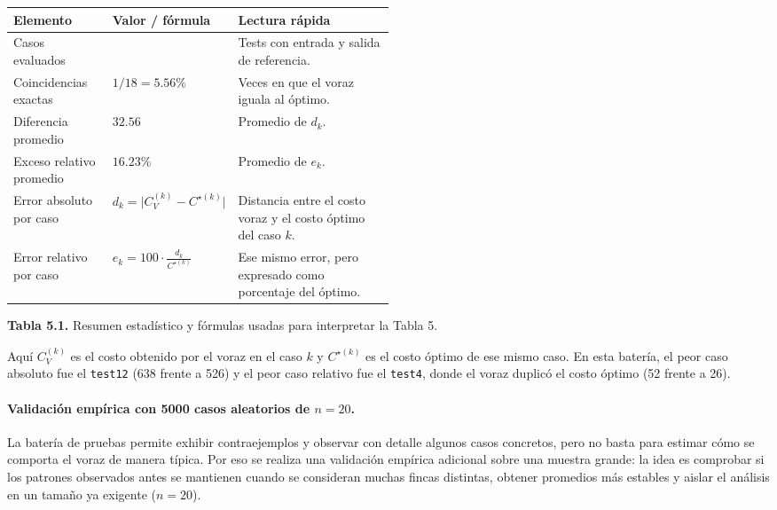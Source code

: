 \documentclass[12pt,a4paper]{article}
\begin{document}
\begin{center}
  \footnotesize
  \begin{minipage}{0.96\textwidth}
    \centering
    \setlength{\tabcolsep}{3pt}
    \renewcommand{\arraystretch}{1.08}
    \begin{tabularx}{\linewidth}{@{}>{\raggedright\arraybackslash}p{0.26\linewidth}>{\centering\arraybackslash}p{0.24\linewidth}>{\raggedright\arraybackslash}X@{}}
      \toprule
      Elemento & Valor / f\'ormula & Lectura r\'apida \\
      \midrule
      Casos evaluados & 18 & Tests con entrada y salida de referencia. \\
      Coincidencias exactas & \(1/18 = 5.56\%\) & Veces en que el voraz iguala al \'optimo. \\
      Diferencia promedio & \(32.56\) & Promedio de \(d_k\). \\
      Exceso relativo promedio & \(16.23\%\) & Promedio de \(e_k\). \\
      Error absoluto por caso & \(d_k=\lvert C_V^{(k)}-C^{\star(k)}\rvert\) & Distancia entre el costo voraz y el costo \'optimo del caso \(k\). \\
      Error relativo por caso & \(e_k=100\cdot \frac{d_k}{C^{\star(k)}}\) & Ese mismo error, pero expresado como porcentaje del \'optimo. \\
      \bottomrule
    \end{tabularx}

    \vspace{0.35em}
    \textbf{Tabla 5.1.} Resumen estad\'istico y f\'ormulas usadas para interpretar la Tabla 5.
  \end{minipage}
\end{center}

Aqu\'i \(C_V^{(k)}\) es el costo obtenido por el voraz en el caso \(k\) y \(C^{\star(k)}\) es el costo \'optimo de ese mismo caso. En esta bater\'ia, el peor caso absoluto fue el \texttt{test12} (638 frente a 526) y el peor caso relativo fue el \texttt{test4}, donde el voraz duplic\'o el costo \'optimo (52 frente a 26).

\paragraph{Validaci\'on emp\'irica con 5000 casos aleatorios de \(n=20\).}
La bater\'ia de pruebas permite exhibir contraejemplos y observar con detalle algunos casos concretos, pero no basta para estimar c\'omo se comporta el voraz de manera t\'ipica. Por eso se realiza una validaci\'on emp\'irica adicional sobre una muestra grande: la idea es comprobar si los patrones observados antes se mantienen cuando se consideran muchas fincas distintas, obtener promedios m\'as estables y aislar el an\'alisis en un tama\~no ya exigente (\(n=20\)).
\end{document}

